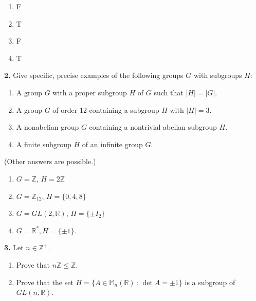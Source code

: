 \documentclass[10pt,]{book}
\theoremstyle{plain}
\theoremstyle{definition}
\theoremstyle{definition}
\theoremstyle{definition}
\theoremstyle{definition}
\numberwithin{equation}{section}
\def\Z{\mathbb{Z}}
\def\R{\mathbb{R}}
\def\M{\mathbb{M}}
\begin{document}
\par\smallskip
\leavevmode%
\begin{multicols}{4}
\begin{enumerate}[label=(\alph*)]
\item\hypertarget{li-213}{}
          F
\item\hypertarget{li-214}{}
          T
\item\hypertarget{li-215}{}
          F
\item\hypertarget{li-216}{}
          T
\end{enumerate}
\end{multicols}
\par\smallskip
\noindent\textbf{2.}\quad{}
        Give specific, precise examples of the following groups \(G\) with subgroups \(H\):
        \leavevmode%
\begin{enumerate}[label=(\alph*)]
\item\hypertarget{li-217}{}
              A group \(G\) with a proper subgroup \(H\) of \(G\) such that \(|H|=|G|\).
\item\hypertarget{li-218}{}
              A group \(G\) of order 12 containing a subgroup \(H\) with \(|H|=3\).
\item\hypertarget{li-219}{}
              A nonabelian group \(G\) containing a nontrivial abelian subgroup \(H\).
\item\hypertarget{li-220}{}
              A finite subgroup \(H\) of an infinite group \(G\).
\end{enumerate}

\par\smallskip

      (Other answers are possible.)
      \leavevmode%
\begin{enumerate}[label=(\alph*)]
\item\hypertarget{li-221}{}
            \(G=\Z\), \(H=2\Z\)
\item\hypertarget{li-222}{}
            \(G=\Z_{12}\), \(H=\{0,4,8\}\)
\item\hypertarget{li-223}{}
            \(G=GL(2,\R)\), \(H=\{\pm I_2\}\)
\item\hypertarget{li-224}{}
            \(G=\R^*, H=\{\pm 1\}\).
\end{enumerate}

\par\smallskip
\noindent\textbf{3.}\quad{}
        Let \(n\in \Z^+\).
        \leavevmode%
\begin{enumerate}[label=(\alph*)]
\item\hypertarget{li-225}{}
              Prove that \(n\Z \leq \Z\).
\item\hypertarget{li-226}{}
              Prove that the set \(H=\{A\in \M_n(\R)\,:\,\det A=\pm 1\}\) is a subgroup of \(GL(n,\R)\).
\end{enumerate}
\end{document}
